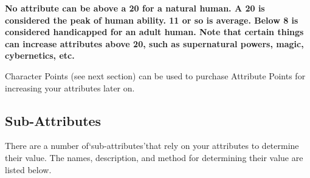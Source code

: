 \documentclass[twoside]{book}
\begin{document}
 \textbf{No attribute can be above a 20 for a natural human. A 20 is considered the peak of human ability. 11 or so is average. Below 8 is considered handicapped for an adult human. Note that certain things can increase attributes above 20, such as supernatural powers, magic, cybernetics, etc.}


    {  
    Character Points (see next section) can be used to purchase Attribute Points for increasing your attributes later on.
    }
  
    

\subsection{Sub-Attributes}
    
    {  
    There are a number of`sub-attributes'that rely on your attributes to determine their value. The names, description, and method for determining their value are listed below.
    }
  
\end{document}
